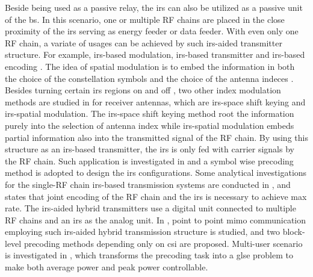 \documentclass[12pt,draftclsnofoot,onecolumn,journal]{IEEEtran}
\begin{document}
Beside being used as a passive relay, the \ac{irs} can also be utilized as a passive unit of the \ac{bs}. In this scenario, one or multiple RF chains are placed in the close proximity of the \ac{irs} serving as energy feeder or data feeder. With even only one RF chain, a variate of usages can be achieved by such \ac{irs}-aided transmitter structure. For example, \ac{irs}-based modulation, \ac{irs}-based transmitter and \ac{irs}-based encoding \cite{di2020smart}. The idea of spatial modulation is to embed the information in both the choice of the constellation symbols and the choice of the antenna indeces \cite{di2011spatial}. Besides turning certain \ac{irs} regions on and off \cite{di2020smart}, two other index modulation methods are studied in \cite{basar2020reconfigurable} for receiver antennas, which are \ac{irs}-space shift keying and \ac{irs}-spatial modulation. The \ac{irs}-space shift keying method root the information purely into the selection of antenna index while \ac{irs}-spatial modulation embeds partial information also into the transmitted signal of the RF chain. By using this structure as an \ac{irs}-based transmitter, the \ac{irs} is only fed with carrier signals by the RF chain. Such application is investigated in \cite{liu2021intelligent} and a symbol wise precoding method is adopted to design the \ac{irs} configurations. Some analytical investigations for the single-RF chain \ac{irs}-based transmission systems are conducted in \cite{karasik2020beyond}, and states that joint encoding of the RF chain and the \ac{irs} is necessary to achieve max rate. The \ac{irs}-aided hybrid 
transmitters use a digital unit connected to multiple RF chains and an \ac{irs} as the analog unit. In \cite{jamali2020intelligent}, point to point \ac{mimo} communication employing such \ac{irs}-aided hybrid transmission structure is studied, and two block-level precoding methods depending only on \ac{csi} are proposed. Multi-user scenario is investigated in \cite{bereyhi2019papr}, which transforms the precoding task into a \ac{glse} problem to make both average power and peak power controllable.
\end{document}
